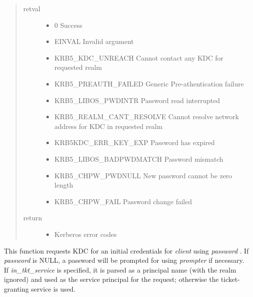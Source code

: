 \documentclass[letterpaper,10pt,english]{sphinxmanual}
\begin{document}
\begin{quote}\begin{description}
\item[{retval}] \leavevmode\begin{itemize}
\item {} 
0   Success

\item {} 
EINVAL   Invalid argument

\item {} 
KRB5\_KDC\_UNREACH   Cannot contact any KDC for requested realm

\item {} 
KRB5\_PREAUTH\_FAILED   Generic Pre-athentication failure

\item {} 
KRB5\_LIBOS\_PWDINTR   Password read interrupted

\item {} 
KRB5\_REALM\_CANT\_RESOLVE   Cannot resolve network address for KDC in requested realm

\item {} 
KRB5KDC\_ERR\_KEY\_EXP   Password has expired

\item {} 
KRB5\_LIBOS\_BADPWDMATCH   Password mismatch

\item {} 
KRB5\_CHPW\_PWDNULL   New password cannot be zero length

\item {} 
KRB5\_CHPW\_FAIL   Password change failed

\end{itemize}

\item[{return}] \leavevmode\begin{itemize}
\item {} 
Kerberos error codes

\end{itemize}

\end{description}\end{quote}

This function requests KDC for an initial credentials for \emph{client} using \emph{password} . If \emph{password} is NULL, a password will be prompted for using \emph{prompter} if necessary. If \emph{in\_tkt\_service} is specified, it is parsed as a principal name (with the realm ignored) and used as the service principal for the request; otherwise the ticket-granting service is used.
\end{document}
